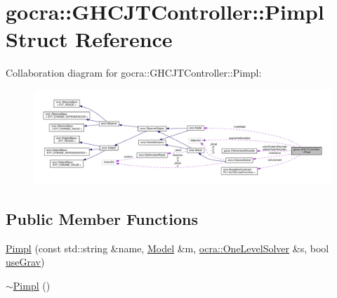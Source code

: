 \hypertarget{structgocra_1_1GHCJTController_1_1Pimpl}{}\section{gocra\+:\+:G\+H\+C\+J\+T\+Controller\+:\+:Pimpl Struct Reference}
\label{structgocra_1_1GHCJTController_1_1Pimpl}


Collaboration diagram for gocra\+:\+:G\+H\+C\+J\+T\+Controller\+:\+:Pimpl\+:
\nopagebreak
\begin{figure}[H]
\begin{center}
\leavevmode
\includegraphics[width=350pt]{dd/d76/structgocra_1_1GHCJTController_1_1Pimpl__coll__graph}
\end{center}
\end{figure}
\subsection*{Public Member Functions}
\begin{DoxyCompactItemize}
\item 
\hyperlink{structgocra_1_1GHCJTController_1_1Pimpl_ad9ff86db7b59559d42a4d87eee73c761}{Pimpl} (const std\+::string \&name, \hyperlink{classocra_1_1Model}{Model} \&m, \hyperlink{classocra_1_1OneLevelSolver}{ocra\+::\+One\+Level\+Solver} \&s, bool \hyperlink{structgocra_1_1GHCJTController_1_1Pimpl_a0a9b1d16fc029929004e00dbf358063a}{use\+Grav})
\item 
\hyperlink{structgocra_1_1GHCJTController_1_1Pimpl_a0df04a7ffd9f5bc6346fc786d1c30ef1}{$\sim$\+Pimpl} ()
\end{DoxyCompactItemize}

